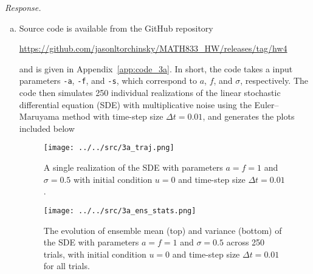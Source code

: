 \textit{Response.}

\begin{enumerate}[a)]
	\item Source code is available from the GitHub repository
	
	\begin{center}
		\url{https://github.com/jasonltorchinsky/MATH833_HW/releases/tag/hw4}
	\end{center}

	and is given in Appendix~\ref{app:code_3a}. In short, the code takes a input parameters \texttt{-a}, \texttt{-f}, and \texttt{-s}, which correspond to $a$, $f$, and $\sigma$, respectively. The code then simulates 250 individual realizations of the linear stochastic differential equation (SDE) with multiplicative noise using the Euler--Maruyama method with time-step size $\Delta t = 0.01$, and generates the plots included below
	
	\begin{figure}[H]
		\centering
		\texttt{[image: ../../src/3a\_traj.png]}
		\caption{A single realization of the SDE with parameters $a = f = 1$ and $\sigma = 0.5$ with initial condition $u = 0$ and time-step size $\Delta t = 0.01$. }
		\label{fig:3a_traj}
	\end{figure}
	
	\begin{figure}[H]
		\centering
		\texttt{[image: ../../src/3a\_ens\_stats.png]}
		\caption{The evolution of ensemble mean (top) and variance (bottom) of the SDE with parameters $a = f = 1$ and $\sigma = 0.5$ across 250 trials, with initial condition $u = 0$ and time-step size $\Delta t = 0.01$ for all trials. }
		\label{fig:3a_ens_stats}
	\end{figure}
	
\end{enumerate}

